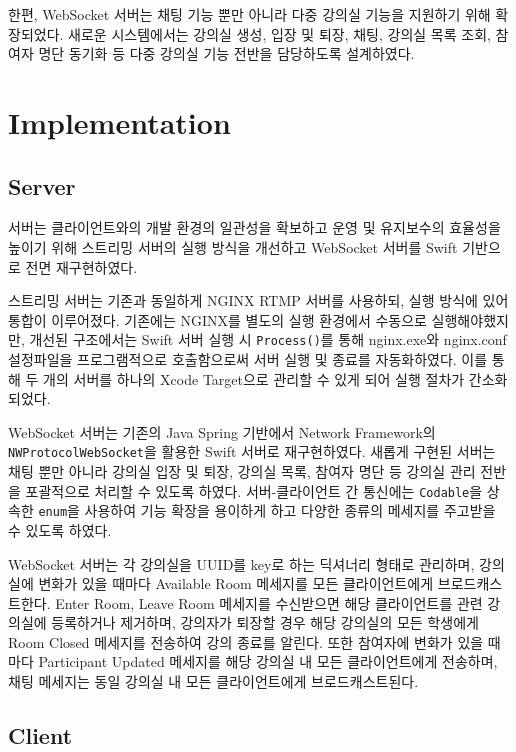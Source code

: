 \documentclass[pdflatex,sn-mathphys-num]{sn-jnl}%
\theoremstyle{thmstyleone}%
\theoremstyle{thmstyletwo}%
\theoremstyle{thmstylethree}%
\begin{document}
한편, WebSocket 서버는 채팅 기능 뿐만 아니라 다중 강의실 기능을 지원하기 위해 확장되었다. 새로운 시스템에서는 강의실 생성, 입장 및 퇴장, 채팅, 강의실 목록 조회, 참여자 명단 동기화 등 다중 강의실 기능 전반을 담당하도록 설계하였다.

\section{Implementation}\label{sec3}

\subsection{Server}\label{subsec2}

서버는 클라이언트와의 개발 환경의 일관성을 확보하고 운영 및 유지보수의 효율성을 높이기 위해 스트리밍 서버의 실행 방식을 개선하고 WebSocket 서버를 Swift 기반으로 전면 재구현하였다.

스트리밍 서버는 기존과 동일하게 NGINX RTMP 서버를 사용하되, 실행 방식에 있어 통합이 이루어졌다. 기존에는 NGINX를 별도의 실행 환경에서 수동으로 실행해야했지만, 개선된 구조에서는 Swift 서버 실행 시 \verb+Process()+를 통해 nginx.exe와 nginx.conf 설정파일을 프로그램적으로 호출함으로써 서버 실행 및 종료를 자동화하였다. 이를 통해 두 개의 서버를 하나의 Xcode Target으로 관리할 수 있게 되어 실행 절차가 간소화되었다.

WebSocket 서버는 기존의 Java Spring 기반에서 Network Framework\cite{Network}의 \verb+NWProtocolWebSocket+을 활용한 Swift 서버로 재구현하였다. 새롭게 구현된 서버는 채팅 뿐만 아니라 강의실 입장 및 퇴장, 강의실 목록, 참여자 명단 등 강의실 관리 전반을 포괄적으로 처리할 수 있도록 하였다. 서버-클라이언트 간 통신에는 \verb+Codable+을 상속한 \verb+enum+을 사용하여 기능 확장을 용이하게 하고 다양한 종류의 메세지를 주고받을 수 있도록 하였다.

WebSocket 서버는 각 강의실을 UUID를 key로 하는 딕셔너리 형태로 관리하며, 강의실에 변화가 있을 때마다 Available Room 메세지를 모든 클라이언트에게 브로드캐스트한다. Enter Room, Leave Room 메세지를 수신받으면 해당 클라이언트를 관련 강의실에 등록하거나 제거하며, 강의자가 퇴장할 경우 해당 강의실의 모든 학생에게 Room Closed 메세지를 전송하여 강의 종료를 알린다. 또한 참여자에 변화가 있을 때마다 Participant Updated 메세지를 해당 강의실 내 모든 클라이언트에게 전송하며, 채팅 메세지는 동일 강의실 내 모든 클라이언트에게 브로드캐스트된다.

\subsection{Client}\label{subsec3}
\end{document}
